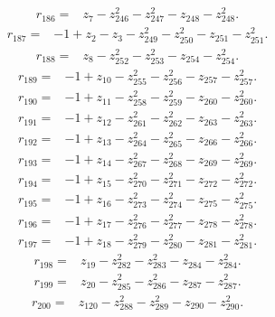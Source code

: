 \begin{align*}
 r_{186}={}&z_{7}-z_{246}^{2}-z_{247}^{2}-z_{248}-z_{248}^{2} .
\end{align*}
\begin{align*}
 r_{187}={}&-1+z_{2}-z_{3}-z_{249}^{2}-z_{250}^{2}-z_{251}-z_{251}^{2} .
\end{align*}
\begin{align*}
 r_{188}={}&z_{8}-z_{252}^{2}-z_{253}^{2}-z_{254}-z_{254}^{2} .
\end{align*}
\begin{align*}
 r_{189}={}&-1+z_{10}-z_{255}^{2}-z_{256}^{2}-z_{257}-z_{257}^{2} .
\end{align*}
\begin{align*}
 r_{190}={}&-1+z_{11}-z_{258}^{2}-z_{259}^{2}-z_{260}-z_{260}^{2} .
\end{align*}
\begin{align*}
 r_{191}={}&-1+z_{12}-z_{261}^{2}-z_{262}^{2}-z_{263}-z_{263}^{2} .
\end{align*}
\begin{align*}
 r_{192}={}&-1+z_{13}-z_{264}^{2}-z_{265}^{2}-z_{266}-z_{266}^{2} .
\end{align*}
\begin{align*}
 r_{193}={}&-1+z_{14}-z_{267}^{2}-z_{268}^{2}-z_{269}-z_{269}^{2} .
\end{align*}
\begin{align*}
 r_{194}={}&-1+z_{15}-z_{270}^{2}-z_{271}^{2}-z_{272}-z_{272}^{2} .
\end{align*}
\begin{align*}
 r_{195}={}&-1+z_{16}-z_{273}^{2}-z_{274}^{2}-z_{275}-z_{275}^{2} .
\end{align*}
\begin{align*}
 r_{196}={}&-1+z_{17}-z_{276}^{2}-z_{277}^{2}-z_{278}-z_{278}^{2} .
\end{align*}
\begin{align*}
 r_{197}={}&-1+z_{18}-z_{279}^{2}-z_{280}^{2}-z_{281}-z_{281}^{2} .
\end{align*}
\begin{align*}
 r_{198}={}&z_{19}-z_{282}^{2}-z_{283}^{2}-z_{284}-z_{284}^{2} .
\end{align*}
\begin{align*}
 r_{199}={}&z_{20}-z_{285}^{2}-z_{286}^{2}-z_{287}-z_{287}^{2} .
\end{align*}
\begin{align*}
 r_{200}={}&z_{120}-z_{288}^{2}-z_{289}^{2}-z_{290}-z_{290}^{2} .
\end{align*}
